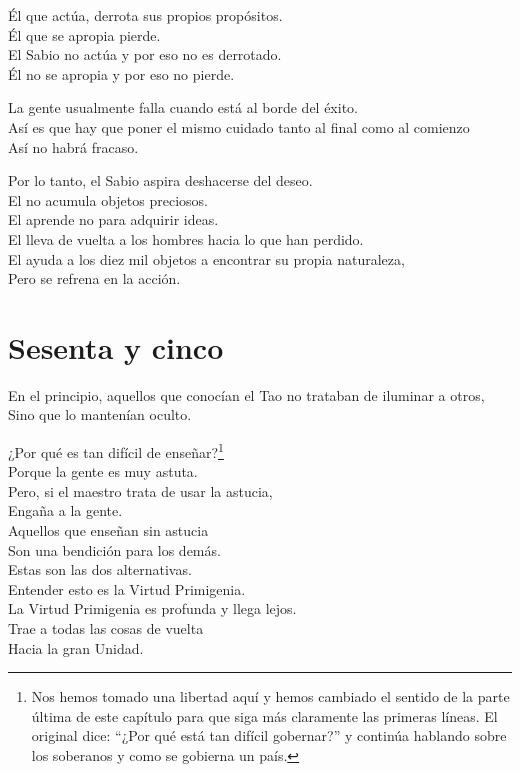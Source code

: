 \documentclass[book,b5paper,hidelinks,final]{memoir}
\begin{document}
	Él que actúa, derrota sus propios propósitos.\\
	Él que se apropia pierde.\\
	El Sabio no actúa y por eso no es derrotado.\\
	Él no se apropia y por eso no pierde.
	
	La gente usualmente falla cuando está al borde del éxito.\\
	Así es que hay que poner el mismo cuidado tanto al final como al
	comienzo\\
	Así no habrá fracaso.
	
	Por lo tanto, el Sabio aspira deshacerse del deseo.\\
	El no acumula objetos preciosos.\\
	El aprende no para adquirir ideas.\\
	El lleva de vuelta a los hombres hacia lo que han perdido.\\
	El ayuda a los diez mil objetos a encontrar su propia naturaleza,\\
	Pero se refrena en la acción.
	
	\chapter*{Sesenta y cinco}
	
	En el principio, aquellos que conocían el Tao no trataban de iluminar a
	otros,\\
	Sino que lo mantenían oculto.
	
	¿Por qué es tan difícil de enseñar?\footnote{Nos hemos tomado una libertad aquí y hemos cambiado el sentido de la
		parte última de este capítulo para que siga más claramente las primeras
		líneas. El original dice: ``¿Por qué está tan difícil gobernar?'' y
		continúa hablando sobre los soberanos y como se gobierna un país.}\\
	Porque la gente es muy astuta.\\
	Pero, si el maestro trata de usar la astucia,\\
	Engaña a la gente.\\
	Aquellos que enseñan sin astucia\\
	Son una bendición para los demás.\\
	Estas son las dos alternativas.\\
	Entender esto es la Virtud Primigenia.\\
	La Virtud Primigenia es profunda y llega lejos.\\
	Trae a todas las cosas de vuelta\\
	Hacia la gran Unidad.
	
\end{document}
